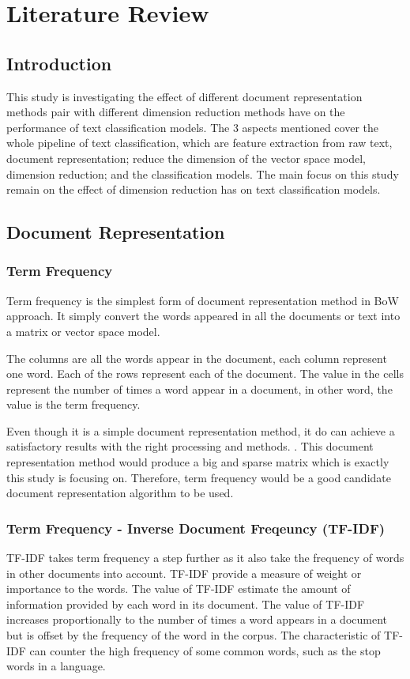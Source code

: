 \chapter{Literature Review}
\section{Introduction}
This study is investigating the effect of different document representation methods pair with different dimension reduction methods have on the performance of text classification models. The 3 aspects mentioned cover the whole pipeline of text classification, which are feature extraction from raw text, document representation; reduce the dimension of the vector space model, dimension reduction; and the classification models. The main focus on this study remain on the effect of dimension reduction has on text classification models.\\

\section{Document Representation}
\subsection{Term Frequency}
Term frequency is the simplest form of document representation method in BoW approach. It simply convert the words appeared in all the documents or text into a matrix or vector space model.

The columns are all the words appear in the document, each column represent one word. Each of the rows represent each of the document. The value in the cells represent the number of times a word appear in a document, in other word, the value is the term frequency.

Even though it is a simple document representation method, it do can achieve a satisfactory results with the right processing and methods. \cite{knnVectorSpaceReduction}. This document representation method would produce a big and sparse matrix which is exactly this study is focusing on. Therefore, term frequency would be a good candidate document representation algorithm to be used.\\

\clearpage
\subsection{Term Frequency - Inverse Document Freqeuncy (TF-IDF)}
TF-IDF takes term frequency a step further as it also take the frequency of words in other documents into account. TF-IDF provide a measure of weight or importance to the words. The value of TF-IDF estimate the amount of information provided by each word in its document. \cite{tfidf} The value of TF-IDF increases proportionally to the number of times a word appears in a document but is offset by the frequency of the word in the corpus. The characteristic of TF-IDF can counter the high frequency of some common words, such as the stop words in a language. 

